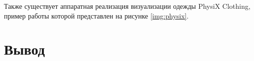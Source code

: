 
Также существует аппаратная реализация визуализации одежды PhysiX
Clothing\cite{site03}, пример работы которой представлен на рисунке
\ref{img:physix}.


\section*{Вывод}

